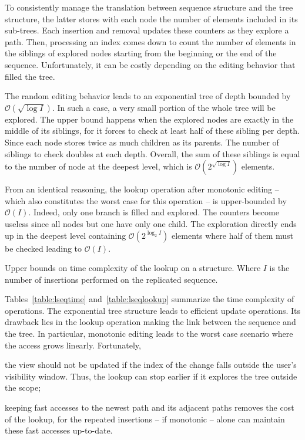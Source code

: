 To consistently manage the translation between sequence structure and the tree
structure, the latter stores with each node the number of elements included in
its sub-trees. Each insertion and removal updates these counters as they explore
a path. Then, processing an index comes down to count the number of elements in
the siblings of explored nodes starting from the beginning or the end of the
sequence. Unfortunately, it can be costly depending on the editing behavior that
filled the tree.

The random editing behavior leads to an exponential tree of depth bounded by
$\mathcal{O}(\sqrt{\log I})$. In such a case, a very small portion of the whole
tree will be explored. The upper bound happens when the explored nodes are
exactly in the middle of its siblings, for it forces to check at least half of
these sibling per depth. Since each node stores twice as much children as its
parents. The number of siblings to check doubles at each depth. Overall, the sum
of these siblings is equal to the number of node at the deepest level, which is
$\mathcal{O}(2^{\sqrt{\log I}})$ elements. 

From an identical reasoning, the lookup operation after monotonic editing --
which also constitutes the worst case for this operation -- is upper-bounded by
$\mathcal{O}(I)$. Indeed, only one branch is filled and explored. The counters
become useless since all nodes but one have only one child. The exploration
directly ends up in the deepest level containing $\mathcal{O}(2^{\log_2 I})$
elements where half of them must be checked leading to
$\mathcal{O}(I)$.

\begin{table}
  \vspace{\ABOVETABLES}
  \caption{\label{table:lseqlookup}
    Upper bounds on time complexity of the lookup on a \LSEQ structure.
    Where $I$ is the number of insertions performed on the replicated sequence.}
  \centering
  
\end{table}

Tables~\ref{table:lseqtime} and~\ref{table:lseqlookup} summarize the time
complexity of operations. The exponential tree structure leads to efficient
update operations. Its drawback lies in the lookup operation making the link
between the sequence and the tree. In particular, monotonic editing leads to the
worst case scenario where the access grows linearly. Fortunately,
\begin{inparaenum}[(i)]
\item the view should not be updated if the index of the change falls outside
  the user's visibility window. Thus, the lookup can stop earlier if it explores
  the tree outside the scope;
\item keeping fast accesses to the newest path and its adjacent paths removes
  the cost of the lookup, for the repeated insertions -- if monotonic -- alone
  can maintain these fast accesses up-to-date.
\end{inparaenum}

